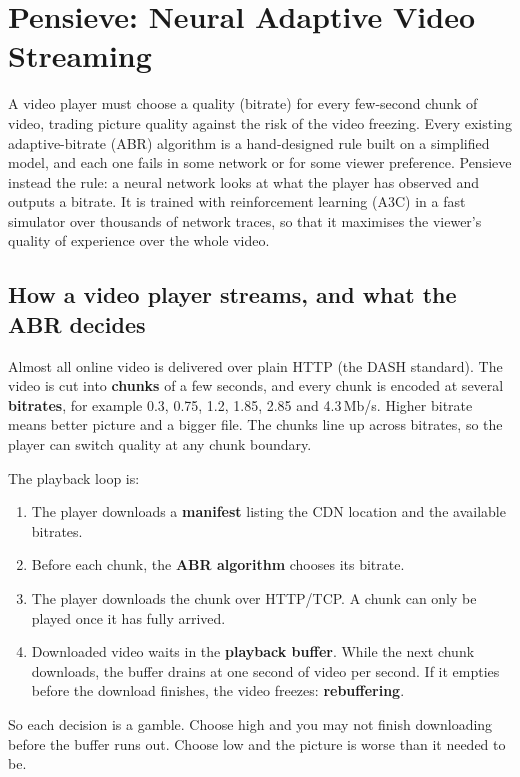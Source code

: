 \chapter{Pensieve: Neural Adaptive Video Streaming}

\begin{keybox}
A video player must choose a quality (bitrate) for every few-second chunk of video, trading picture quality against the risk of the video
freezing. Every existing adaptive-bitrate (ABR) algorithm is a hand-designed rule built on a simplified model, and each one fails in some
network or for some viewer preference. Pensieve instead  the rule: a neural network looks at what the player has observed and
outputs a bitrate. It is trained with reinforcement learning (A3C) in a fast simulator over thousands of network traces, so that it
maximises the viewer's quality of experience over the whole video.
\end{keybox}

\section{How a video player streams, and what the ABR decides}


Almost all online video is delivered over plain HTTP (the DASH standard). The video is cut into \textbf{chunks} of a few seconds, and every
chunk is encoded at several \textbf{bitrates}, for example 0.3, 0.75, 1.2, 1.85, 2.85 and 4.3\,Mb/s. Higher bitrate means better picture and a
bigger file. The chunks line up across bitrates, so the player can switch quality at any chunk boundary.

The playback loop is:
\begin{enumerate}
  \item The player downloads a \textbf{manifest} listing the CDN location and the available bitrates.
  \item Before each chunk, the \textbf{ABR algorithm} chooses its bitrate.
  \item The player downloads the chunk over HTTP/TCP. A chunk can only be played once it has fully arrived.
  \item Downloaded video waits in the \textbf{playback buffer}. While the next chunk downloads, the buffer drains at one second of video per
        second. If it empties before the download finishes, the video freezes: \textbf{rebuffering}.
\end{enumerate}
So each decision is a gamble. Choose high and you may not finish downloading before the buffer runs out. Choose low and the picture is worse than
it needed to be.

